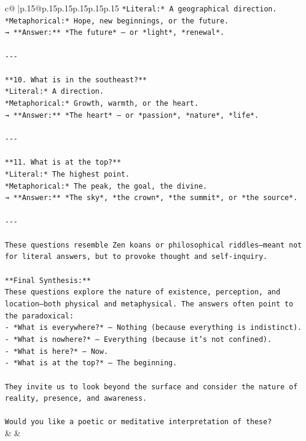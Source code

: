\documentclass{article}
\begin{document}
{\begin{supertabular}{c@{$\;$}|p{.15\linewidth}@{}p{.15\linewidth}p{.15\linewidth}p{.15\linewidth}p{.15\linewidth}p{.15\linewidth}}
{{{\texttt{*Literal:* A geographical direction.  } \\
\texttt{*Metaphorical:* Hope, new beginnings, or the future.  } \\
\texttt{→ **Answer:** *The future* — or *light*, *renewal*.} \\
\\ 
\texttt{{-}{-}{-}} \\
\\ 
\texttt{**10. What is in the southeast?**  } \\
\texttt{*Literal:* A direction.  } \\
\texttt{*Metaphorical:* Growth, warmth, or the heart.  } \\
\texttt{→ **Answer:** *The heart* — or *passion*, *nature*, *life*.} \\
\\ 
\texttt{{-}{-}{-}} \\
\\ 
\texttt{**11. What is at the top?**  } \\
\texttt{*Literal:* The highest point.  } \\
\texttt{*Metaphorical:* The peak, the goal, the divine.  } \\
\texttt{→ **Answer:** *The sky*, *the crown*, *the summit*, or *the source*.} \\
\\ 
\texttt{{-}{-}{-}} \\
\\ 
\texttt{These questions resemble Zen koans or philosophical riddles—meant not for literal answers, but to provoke thought and self{-}inquiry.} \\
\\ 
\texttt{**Final Synthesis:**  } \\
\texttt{These questions explore the nature of existence, perception, and location—both physical and metaphysical. The answers often point to the paradoxical:  } \\
\texttt{{-} *What is everywhere?* — Nothing (because everything is indistinct).  } \\
\texttt{{-} *What is nowhere?* — Everything (because it’s not confined).  } \\
\texttt{{-} *What is here?* — Now.  } \\
\texttt{{-} *What is at the top?* — The beginning.  } \\
\\ 
\texttt{They invite us to look beyond the surface and consider the nature of reality, presence, and awareness.} \\
\\ 
\texttt{Would you like a poetic or meditative interpretation of these?} \\
            }
        }
    }
    & & \\ \\


\end{supertabular}}
\end{document}
